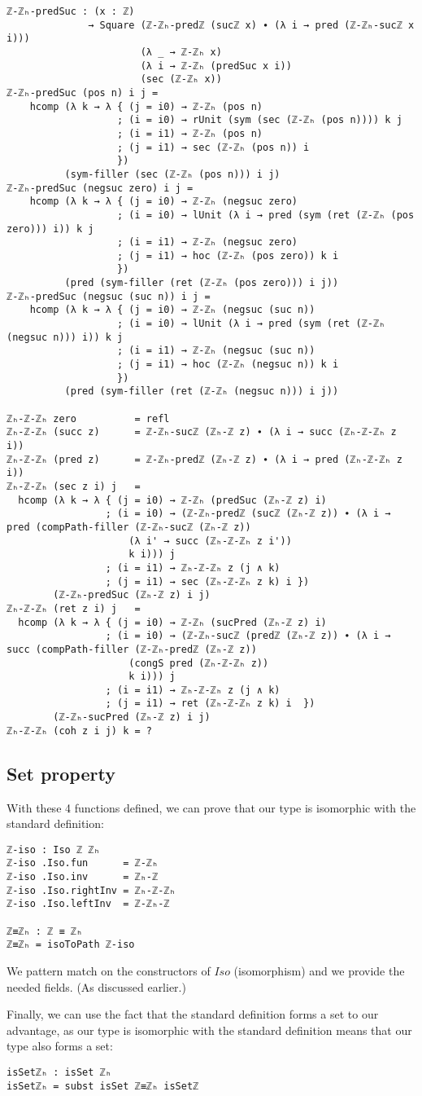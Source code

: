 \begin{verbatim}
ℤ-ℤₕ-predSuc : (x : ℤ)
              → Square (ℤ-ℤₕ-predℤ (sucℤ x) ∙ (λ i → pred (ℤ-ℤₕ-sucℤ x i)))
                       (λ _ → ℤ-ℤₕ x)
                       (λ i → ℤ-ℤₕ (predSuc x i))
                       (sec (ℤ-ℤₕ x))
ℤ-ℤₕ-predSuc (pos n) i j =
    hcomp (λ k → λ { (j = i0) → ℤ-ℤₕ (pos n)
                   ; (i = i0) → rUnit (sym (sec (ℤ-ℤₕ (pos n)))) k j
                   ; (i = i1) → ℤ-ℤₕ (pos n)
                   ; (j = i1) → sec (ℤ-ℤₕ (pos n)) i
                   })
          (sym-filler (sec (ℤ-ℤₕ (pos n))) i j)
ℤ-ℤₕ-predSuc (negsuc zero) i j =
    hcomp (λ k → λ { (j = i0) → ℤ-ℤₕ (negsuc zero)
                   ; (i = i0) → lUnit (λ i → pred (sym (ret (ℤ-ℤₕ (pos zero))) i)) k j
                   ; (i = i1) → ℤ-ℤₕ (negsuc zero)
                   ; (j = i1) → hoc (ℤ-ℤₕ (pos zero)) k i
                   })
          (pred (sym-filler (ret (ℤ-ℤₕ (pos zero))) i j))
ℤ-ℤₕ-predSuc (negsuc (suc n)) i j =
    hcomp (λ k → λ { (j = i0) → ℤ-ℤₕ (negsuc (suc n))
                   ; (i = i0) → lUnit (λ i → pred (sym (ret (ℤ-ℤₕ (negsuc n))) i)) k j
                   ; (i = i1) → ℤ-ℤₕ (negsuc (suc n))
                   ; (j = i1) → hoc (ℤ-ℤₕ (negsuc n)) k i
                   })
          (pred (sym-filler (ret (ℤ-ℤₕ (negsuc n))) i j))

ℤₕ-ℤ-ℤₕ zero          = refl
ℤₕ-ℤ-ℤₕ (succ z)      = ℤ-ℤₕ-sucℤ (ℤₕ-ℤ z) ∙ (λ i → succ (ℤₕ-ℤ-ℤₕ z i))
ℤₕ-ℤ-ℤₕ (pred z)      = ℤ-ℤₕ-predℤ (ℤₕ-ℤ z) ∙ (λ i → pred (ℤₕ-ℤ-ℤₕ z i))
ℤₕ-ℤ-ℤₕ (sec z i) j   =
  hcomp (λ k → λ { (j = i0) → ℤ-ℤₕ (predSuc (ℤₕ-ℤ z) i)
                 ; (i = i0) → (ℤ-ℤₕ-predℤ (sucℤ (ℤₕ-ℤ z)) ∙ (λ i → pred (compPath-filler (ℤ-ℤₕ-sucℤ (ℤₕ-ℤ z))
                     (λ i' → succ (ℤₕ-ℤ-ℤₕ z i'))
                     k i))) j
                 ; (i = i1) → ℤₕ-ℤ-ℤₕ z (j ∧ k)
                 ; (j = i1) → sec (ℤₕ-ℤ-ℤₕ z k) i })
        (ℤ-ℤₕ-predSuc (ℤₕ-ℤ z) i j)
ℤₕ-ℤ-ℤₕ (ret z i) j   =
  hcomp (λ k → λ { (j = i0) → ℤ-ℤₕ (sucPred (ℤₕ-ℤ z) i)
                 ; (i = i0) → (ℤ-ℤₕ-sucℤ (predℤ (ℤₕ-ℤ z)) ∙ (λ i → succ (compPath-filler (ℤ-ℤₕ-predℤ (ℤₕ-ℤ z))
                     (congS pred (ℤₕ-ℤ-ℤₕ z))
                     k i))) j
                 ; (i = i1) → ℤₕ-ℤ-ℤₕ z (j ∧ k)
                 ; (j = i1) → ret (ℤₕ-ℤ-ℤₕ z k) i  })
        (ℤ-ℤₕ-sucPred (ℤₕ-ℤ z) i j)
ℤₕ-ℤ-ℤₕ (coh z i j) k = ?
\end{verbatim}

\subsection{Set property}
With these 4 functions defined, we can prove that our type is isomorphic with the standard definition:
\begin{verbatim}
ℤ-iso : Iso ℤ ℤₕ
ℤ-iso .Iso.fun      = ℤ-ℤₕ
ℤ-iso .Iso.inv      = ℤₕ-ℤ
ℤ-iso .Iso.rightInv = ℤₕ-ℤ-ℤₕ
ℤ-iso .Iso.leftInv  = ℤ-ℤₕ-ℤ

ℤ≡ℤₕ : ℤ ≡ ℤₕ
ℤ≡ℤₕ = isoToPath ℤ-iso
\end{verbatim}
We pattern match on the constructors of $Iso$ (isomorphism) and we provide the needed fields. (As discussed earlier.)

Finally, we can use the fact that the standard definition forms a set to our advantage, as our type is isomorphic with the standard definition means that our type also forms a set:
\begin{verbatim}
isSetℤₕ : isSet ℤₕ
isSetℤₕ = subst isSet ℤ≡ℤₕ isSetℤ
\end{verbatim}
